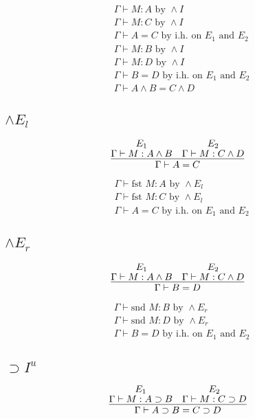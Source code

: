 \documentclass[11pt]{article}
\begin{document}
\begin{align*}
  & \Gamma \vdash M:A \text{ by } \wedge I \\
  & \Gamma \vdash M:C \text{ by } \wedge I \\
  & \Gamma \vdash A=C \text{ by i.h. on $E_1$ and $E_2$} \\
  & \Gamma \vdash M:B \text{ by } \wedge I \\
  & \Gamma \vdash M:D \text{ by } \wedge I \\
  & \Gamma \vdash B=D \text{ by i.h. on $E_1$ and $E_2$} \\
  & \Gamma \vdash A \wedge B = C \wedge D
\end{align*}

\subsection{$\wedge E_l$}
\[
\infer
  {\Gamma \vdash A = C}
  {
    \deduce{\Gamma \vdash M: A \wedge B}{E_1} &
    \deduce{\Gamma \vdash M: C \wedge D}{E_2}
  }
\]


\begin{align*}
  & \Gamma \vdash \text{fst } M : A \text{ by } \wedge E_l \\
  & \Gamma \vdash \text{fst } M : C \text{ by } \wedge E_l \\
  & \Gamma \vdash A = C \text{ by i.h. on $E_1$ and $E_2$}
\end{align*}


\subsection{$\wedge E_r$}
\[
\infer
  {\Gamma \vdash B = D}
  {
    \deduce{\Gamma \vdash M: A \wedge B}{E_1} &
    \deduce{\Gamma \vdash M: C \wedge D}{E_2}
  }
\]


\begin{align*}
  & \Gamma \vdash \text{snd } M : B \text{ by } \wedge E_r \\
  & \Gamma \vdash \text{snd } M : D \text{ by } \wedge E_r \\
  & \Gamma \vdash B = D \text{ by i.h. on $E_1$ and $E_2$}
\end{align*}

\subsection{$\supset I^u$}

\[
\infer
  {\Gamma \vdash A \supset B = C \supset D}
  {
    \deduce{\Gamma \vdash M: A \supset B}{E_1} &
    \deduce{\Gamma \vdash M: C \supset D}{E_2}
  }
\]
\end{document}
